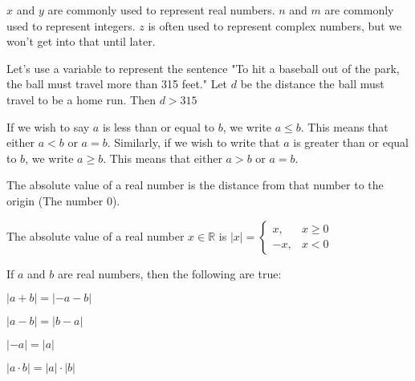 \documentclass[crop=false,class=book,oneside]{standalone}
\begin{document}
            \begin{example}
            $x$ and $y$ are commonly used to represent real numbers. $n$ and $m$ are commonly used to represent integers. $z$ is often used to represent complex numbers, but we won't get into that until later.
            \end{example}
            \begin{example}
            Let's use a variable to represent the sentence "To hit a baseball out of the park, the ball must travel more than 315 feet." Let $d$ be the distance the ball must travel to be a home run. Then $d>315$
            \end{example}
            \begin{notation}
            If we wish to say $a$ is less than or equal to $b$, we write $a\leq b$. This means that either $a<b$ or $a=b$. Similarly, if we wish to write that $a$ is greater than or equal to $b$, we write $a\geq b$. This means that either $a>b$ or $a=b$.
            \end{notation}
            The absolute value of a real number is the distance from that number to the origin (The number $0$).
            \begin{definition}
            The absolute value of a real number $x\in \mathbb{R}$ is $|x| = \begin{cases} x, & x \geq 0 \\ -x, & x<0 \end{cases}$
            \end{definition}
            \begin{theorem}
            If $a$ and $b$ are real numbers, then the following are true:
            \begin{enumerate}
            \begin{multicols}{4}
            \item $|a+b| = |-a-b|$
            \item $|a-b| = |b-a|$
            \item $|-a| = |a|$
            \item $|a\cdot b| = |a|\cdot |b|$
            \end{multicols}
            \end{enumerate}
            \end{theorem}
            
\end{document}
